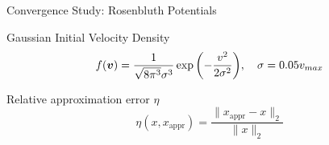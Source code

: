\begin{frame}{Convergence Study: Rosenbluth Potentials}

    \begin{block}{Gaussian Initial Velocity Density}
        \begin{equation}
            f(\boldsymbol{v}) = \frac{1}{\sqrt{8 \pi^3} \sigma^3}
            \exp{\left( -\frac{v^2}{2 \sigma^2} \right)}, \quad \sigma = 0.05 v_{max}
            \label{eq:gaussianDensity}
        \end{equation}
    \end{block}
    
    \begin{block}{Relative approximation error $\eta$}
        \begin{equation}
            \eta(x, x_{\text{appr}}) = \frac{\lVert x_{\text{appr}}-x \rVert_2}{\lVert x \rVert_2}
        \end{equation}
    \end{block}


\end{frame}

